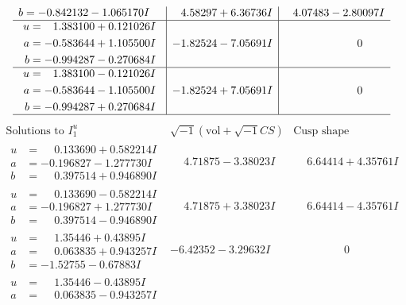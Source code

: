 \documentclass[1p]{elsarticle_modified}
\theoremstyle{definition}
\newcommand{\I}{\sqrt{-1}}
\begin{document}
$$\begin{array}{c|c|c}
\begin{aligned}
b &= -0.842132 - 1.065170 I\end{aligned}
 & \phantom{-}4.58297 + 6.36736 I & \phantom{-}4.07483 - 2.80097 I \\ \hline\begin{aligned}
u &= \phantom{-}1.383100 + 0.121026 I \\
a &= -0.583644 + 1.105500 I \\
b &= -0.994287 - 0.270684 I\end{aligned}
 & -1.82524 - 7.05691 I & \phantom{-0.000000 } 0 \\ \hline\begin{aligned}
u &= \phantom{-}1.383100 - 0.121026 I \\
a &= -0.583644 - 1.105500 I \\
b &= -0.994287 + 0.270684 I\end{aligned}
 & -1.82524 + 7.05691 I & \phantom{-0.000000 } 0\\
 \hline 
 \end{array}$$\newpage$$\begin{array}{c|c|c}  
\text{Solutions to }I^u_{1}& \I (\text{vol} + \sqrt{-1}CS) & \text{Cusp shape}\\
 \hline 
\begin{aligned}
u &= \phantom{-}0.133690 + 0.582214 I \\
a &= -0.196827 - 1.277730 I \\
b &= \phantom{-}0.397514 + 0.946890 I\end{aligned}
 & \phantom{-}4.71875 - 3.38023 I & \phantom{-}6.64414 + 4.35761 I \\ \hline\begin{aligned}
u &= \phantom{-}0.133690 - 0.582214 I \\
a &= -0.196827 + 1.277730 I \\
b &= \phantom{-}0.397514 - 0.946890 I\end{aligned}
 & \phantom{-}4.71875 + 3.38023 I & \phantom{-}6.64414 - 4.35761 I \\ \hline\begin{aligned}
u &= \phantom{-}1.35446 + 0.43895 I \\
a &= \phantom{-}0.063835 + 0.943257 I \\
b &= -1.52755 - 0.67883 I\end{aligned}
 & -6.42352 - 3.29632 I & \phantom{-0.000000 } 0 \\ \hline\begin{aligned}
u &= \phantom{-}1.35446 - 0.43895 I \\
a &= \phantom{-}0.063835 - 0.943257 I \\

\end{aligned}
\end{array}$$
\end{document}
